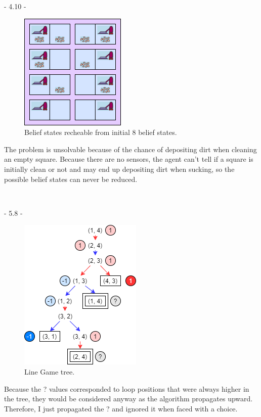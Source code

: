 \documentclass[12pt]{article}
\begin{document}
\centerline{- 4.10 - }
\begin{figure}[htbp]
\centerline{\includegraphics{Pics/ComS472_410.png}}
\caption{Belief states recheable from initial 8 belief states.}
\label{Belief states recheable from initial 8 belief states.}
\end{figure}

The problem is unsolvable because of the chance of depositing dirt when cleaning an empty square. Because there are no sensors, the agent can't tell if a square is initially clean or not and may end up depositing dirt when sucking, so the possible belief states can never be reduced.


\noindent \hrulefill \\\pagebreak


\centerline{- 5.8 - }
\begin{figure}[htbp]
\centerline{\includegraphics{Pics/ComS472_58ptB.png}}
\caption{Line Game tree.}
\label{Line Game tree.}
\end{figure}

Because the ? values corresponded to loop positions that were always higher in the tree, they would be considered anyway as the algorithm propagates upward. Therefore, I just propagated the ? and ignored it when faced with a choice.\\
\end{document}
